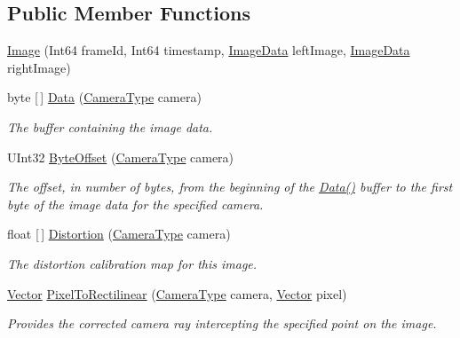\subsection*{Public Member Functions}
\begin{DoxyCompactItemize}
\item 
\mbox{\hyperlink{class_leap_1_1_image_a0a4c011e7107572da7f9c736b50da4a7}{Image}} (Int64 frame\+Id, Int64 timestamp, \mbox{\hyperlink{class_leap_internal_1_1_image_data}{Image\+Data}} left\+Image, \mbox{\hyperlink{class_leap_internal_1_1_image_data}{Image\+Data}} right\+Image)
\item 
byte \mbox{[}$\,$\mbox{]} \mbox{\hyperlink{class_leap_1_1_image_a13a2744f47a3bb324d08dca19d971f17}{Data}} (\mbox{\hyperlink{class_leap_1_1_image_a28310e43e0f2d7f7117e1b45330bdc38}{Camera\+Type}} camera)
\begin{DoxyCompactList}\small\item\em The buffer containing the image data. \end{DoxyCompactList}\item 
U\+Int32 \mbox{\hyperlink{class_leap_1_1_image_aaab2f799bc4f2f315c26d14401b8a7e7}{Byte\+Offset}} (\mbox{\hyperlink{class_leap_1_1_image_a28310e43e0f2d7f7117e1b45330bdc38}{Camera\+Type}} camera)
\begin{DoxyCompactList}\small\item\em The offset, in number of bytes, from the beginning of the \mbox{\hyperlink{class_leap_1_1_image_a13a2744f47a3bb324d08dca19d971f17}{Data()}} buffer to the first byte of the image data for the specified camera. \end{DoxyCompactList}\item 
float \mbox{[}$\,$\mbox{]} \mbox{\hyperlink{class_leap_1_1_image_a5bf2883749b04f3e5644fc68a418add4}{Distortion}} (\mbox{\hyperlink{class_leap_1_1_image_a28310e43e0f2d7f7117e1b45330bdc38}{Camera\+Type}} camera)
\begin{DoxyCompactList}\small\item\em The distortion calibration map for this image. \end{DoxyCompactList}\item 
\mbox{\hyperlink{struct_leap_1_1_vector}{Vector}} \mbox{\hyperlink{class_leap_1_1_image_a8fd5b7f8e734a2b7232ac7b315828987}{Pixel\+To\+Rectilinear}} (\mbox{\hyperlink{class_leap_1_1_image_a28310e43e0f2d7f7117e1b45330bdc38}{Camera\+Type}} camera, \mbox{\hyperlink{struct_leap_1_1_vector}{Vector}} pixel)
\begin{DoxyCompactList}\small\item\em Provides the corrected camera ray intercepting the specified point on the image. \end{DoxyCompactList}\item 

\end{DoxyCompactItemize}
